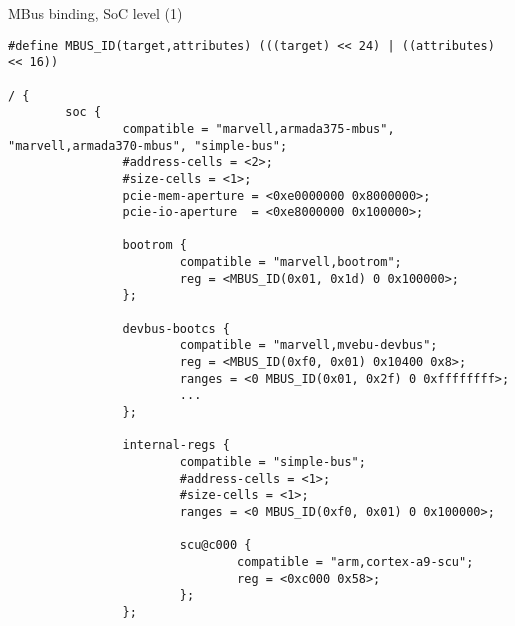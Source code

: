 \begin{frame}[fragile]{MBus binding, SoC level (1)}

\tiny
\begin{verbatim}
#define MBUS_ID(target,attributes) (((target) << 24) | ((attributes) << 16))

/ {
        soc {
                compatible = "marvell,armada375-mbus", "marvell,armada370-mbus", "simple-bus";
                #address-cells = <2>;
                #size-cells = <1>;
                pcie-mem-aperture = <0xe0000000 0x8000000>;
                pcie-io-aperture  = <0xe8000000 0x100000>;

                bootrom {
                        compatible = "marvell,bootrom";
                        reg = <MBUS_ID(0x01, 0x1d) 0 0x100000>;
                };

                devbus-bootcs {
                        compatible = "marvell,mvebu-devbus";
                        reg = <MBUS_ID(0xf0, 0x01) 0x10400 0x8>;
                        ranges = <0 MBUS_ID(0x01, 0x2f) 0 0xffffffff>;
                        ...
                };

                internal-regs {
                        compatible = "simple-bus";
                        #address-cells = <1>;
                        #size-cells = <1>;
                        ranges = <0 MBUS_ID(0xf0, 0x01) 0 0x100000>;

                        scu@c000 {
                                compatible = "arm,cortex-a9-scu";
                                reg = <0xc000 0x58>;
                        };
                };
\end{verbatim}

\end{frame}

